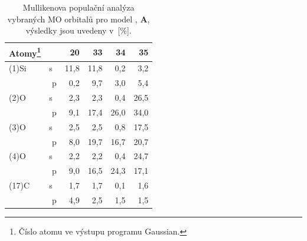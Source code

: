 \documentclass[
digital, %
table,   %
nolof,     %
nolot,     %
oneside,
]{fithesis3}
\begin{document}
\begin{table}[H]\begin{minipage}{\textwidth}
\caption{Mullikenova populační analýza vybraných MO orbitalů pro model , \textbf{A}, výsledky jsou uvedeny v~[\%].}
\begin{center}
\begin{tabular}{|l|r|r|r|r|r|}
\hline
Atomy\footnote{Číslo atomu ve výstupu programu Gaussian.} \label{si_ch3_och3_MPA}&  & 20 & 33 & 34 & 35 \\ \hline
(1)Si & s~& 11,8 & 11,8 & 0,2 & 3,2 \\ \hline
& p & 0,2 & 9,7 & 3,0 & 5,4 \\ \hline
(2)O & s~& 2,3 & 2,3 & 0,4 & 26,5 \\ \hline
& p & 9,1 & 17,4 & 26,0 & 34,0 \\ \hline
(3)O & s~& 2,5 & 2,5 & 0,8 & 17,5 \\ \hline
& p & 8,0 & 19,7 & 16,7 & 20,7 \\ \hline
(4)O & s~& 2,2 & 2,2 & 0,4 & 24,7 \\ \hline
& p & 9,0 & 16,5 & 24,3 & 17,1 \\ \hline
(17)C & s~& 1,7 & 1,7 & 0,1 & 1,6 \\ \hline
& p & 4,9 & 2,5 & 1,5 & 1,5 \\ \hline
\end{tabular}
\end{center}
\end{minipage}
\end{table}
\end{document}
